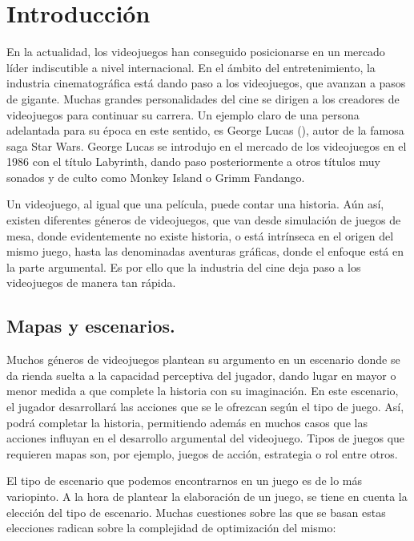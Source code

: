 \chapter*{Introducción}
\label{intro:intro}

En la actualidad, los videojuegos han conseguido posicionarse en un mercado líder indiscutible a nivel internacional. En el ámbito del entretenimiento, la industria cinematográfica está dando paso a los videojuegos, que avanzan a pasos de gigante. Muchas grandes personalidades del cine se dirigen a los creadores de videojuegos para continuar su carrera. Un ejemplo claro de una persona adelantada para su época en este sentido, es George Lucas (\cite{lucasarts}), autor de la famosa saga Star Wars. George Lucas se introdujo en el mercado de los videojuegos en el 1986 con el título Labyrinth, dando paso posteriormente a otros títulos muy sonados y de culto como Monkey Island o Grimm Fandango.

Un videojuego, al igual que una película, puede contar una historia. Aún así, existen diferentes géneros de videojuegos, que van desde simulación de juegos de mesa, donde evidentemente no existe historia, o está intrínseca en el origen del mismo juego, hasta las denominadas aventuras gráficas, donde el enfoque está en la parte argumental. Es por ello que la industria del cine deja paso a los videojuegos de manera tan rápida.

\section*{Mapas y escenarios.}

Muchos géneros de videojuegos plantean su argumento en un escenario donde se da rienda suelta a la capacidad perceptiva del jugador, dando lugar en mayor o menor medida a que complete la historia con su imaginación. En este escenario, el jugador desarrollará las acciones que se le ofrezcan según el tipo de juego. Así, podrá completar la historia, permitiendo además en muchos casos que las acciones influyan en el desarrollo argumental del videojuego. Tipos de juegos que requieren mapas son, por ejemplo, juegos de acción, estrategia o rol entre otros.

El tipo de escenario que podemos encontrarnos en un juego es de lo más variopinto. A la hora de plantear la elaboración de un juego, se tiene en cuenta la elección del tipo de escenario. Muchas cuestiones sobre las que se basan estas elecciones radican sobre la complejidad de optimización del mismo:

